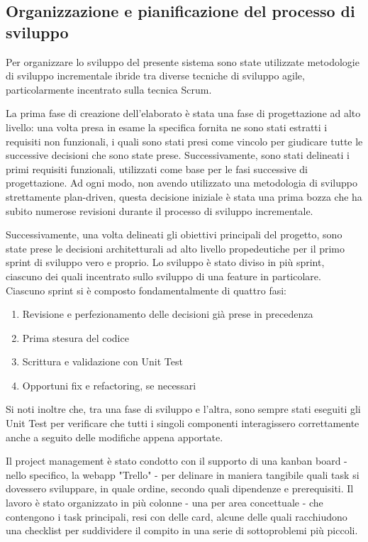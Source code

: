 \documentclass{article}
\begin{document}
\subsection{Organizzazione e pianificazione del processo di sviluppo}

Per organizzare lo sviluppo del presente sistema sono state utilizzate metodologie di sviluppo incrementale ibride tra diverse tecniche di sviluppo agile, particolarmente incentrato sulla tecnica Scrum.

La prima fase di creazione dell'elaborato è stata una fase di progettazione ad alto livello: una volta presa in esame la specifica fornita ne sono stati estratti i requisiti non funzionali, i quali sono stati presi come vincolo per giudicare tutte le successive decisioni che sono state prese. Successivamente, sono stati delineati i primi requisiti funzionali, utilizzati come base per le fasi successive di progettazione. Ad ogni modo, non avendo utilizzato una metodologia di sviluppo strettamente plan-driven, questa decisione iniziale è stata una prima bozza che ha subito numerose revisioni durante il processo di sviluppo incrementale.

Successivamente, una volta delineati gli obiettivi principali del progetto, sono state prese le decisioni architetturali ad alto livello propedeutiche per il primo sprint di sviluppo vero e proprio. Lo sviluppo è stato diviso in più sprint, ciascuno dei quali incentrato sullo sviluppo di una feature in particolare. Ciascuno sprint si è composto fondamentalmente di quattro fasi:

\begin{enumerate}
    \item Revisione e perfezionamento delle decisioni già prese in precedenza
    \item Prima stesura del codice
    \item Scrittura e validazione con Unit Test
    \item Opportuni fix e refactoring, se necessari
\end{enumerate}

Si noti inoltre che, tra una fase di sviluppo e l'altra, sono sempre stati eseguiti gli Unit Test per verificare che tutti i singoli componenti interagissero correttamente anche a seguito delle modifiche appena apportate.

Il project management è stato condotto con il supporto di una kanban board - nello specifico, la webapp "Trello" - per delinare in maniera tangibile quali task si dovessero sviluppare, in quale ordine, secondo quali dipendenze e prerequisiti. Il lavoro è stato organizzato in più colonne - una per area concettuale - che contengono i task principali, resi con delle card, alcune delle quali racchiudono una checklist per suddividere il compito in una serie di sottoproblemi più piccoli.
\end{document}
